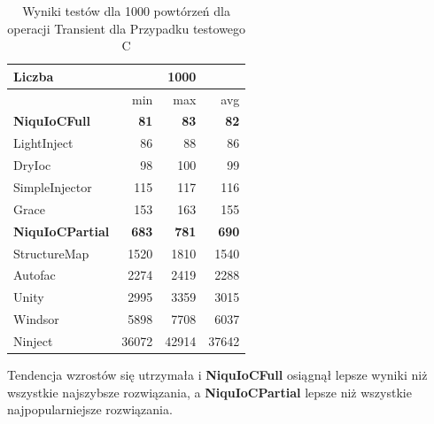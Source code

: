 \documentclass[12pt]{article}
\begin{document}
\begin{table}[H]
\captionsetup{belowskip=0pt,aboveskip=0pt}
\begin{center}
\begin{small}
	\begin{tabular}{ | l | r r r | }
    		\hline
Liczba & & 1000 & \\ \hline
 & min & max & avg \\ \hline
\textbf{NiquIoCFull} & \textbf{81} & \textbf{83} & \textbf{82} \\ \hline
LightInject & 86 & 88 & 86 \\ \hline
DryIoc & 98 & 100 & 99 \\ \hline
SimpleInjector & 115 & 117 & 116 \\ \hline
Grace & 153 & 163 & 155 \\ \hline
\textbf{NiquIoCPartial} & \textbf{683} & \textbf{781} & \textbf{690} \\ \hline
StructureMap & 1520 & 1810 & 1540 \\ \hline
Autofac & 2274 & 2419 & 2288 \\ \hline
Unity & 2995 & 3359 & 3015 \\ \hline
Windsor & 5898 & 7708 & 6037 \\ \hline
Ninject & 36072 & 42914 & 37642 \\ \hline
  	\end{tabular}
\end{small}
\end{center}
\caption{Wyniki testów dla 1000 powtórzeń dla operacji Transient dla Przypadku testowego C}
\label{TestCaseC_Transient1000}
\end{table}
Tendencja wzrostów się utrzymała i \textbf{NiquIoCFull} osiągnął lepsze wyniki niż wszystkie najszybsze rozwiązania, a \textbf{NiquIoCPartial} lepsze niż wszystkie najpopularniejsze rozwiązania.
\end{document}
